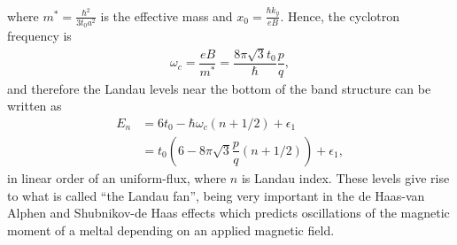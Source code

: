 \documentclass{report}
\newcommand{\f}[2]{\dfrac{#1}{#2}}
\begin{document}
where $m^{*} = \frac{\hbar^{2}}{3t_{0}a^{2}}$ is the effective mass and $x_{0} = \frac{\hbar k_{y}}{eB}$. Hence, the cyclotron frequency is
\begin{gather}
	\omega_{c} = \f{eB}{m^{*}} = \f{8 \pi \sqrt{3} t_{0}}{\hbar}  \f{p}{q},
\end{gather}
and therefore the Landau levels near the bottom of the band structure can be written as
\begin{equation}
	\begin{aligned}
		E_{n}
		 & = 6 t_{0} - \hbar \omega_{c} (n + 1 /2) + \epsilon_{1}                    \\
		 & = t_{0} \left(6 - 8\pi\sqrt{3} \f{p}{q}( n + 1 /2)\right) + \epsilon_{1},
	\end{aligned}
\end{equation}
in linear order of an uniform-flux, where $n$ is Landau index. These levels give rise to what is called ``the Landau fan'', being very important in the de Haas-van Alphen and Shubnikov-de Haas effects \cite{10.1119/1.1615568} which predicts oscillations of the magnetic moment of a meltal depending on an applied magnetic field.
\end{document}
